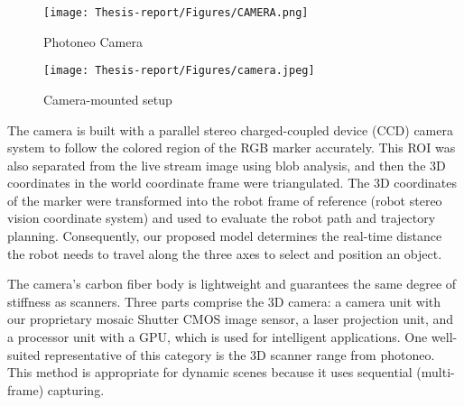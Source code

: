 \documentclass[12pt]{article}
\begin{document}
\begin{figure}[h]
    \centering
    \texttt{[image: Thesis-report/Figures/CAMERA.png]}
    \caption{Photoneo Camera \cite{ref2}} 
    \label{fig:Photoneo-camera}
\end{figure}

\begin{figure}[h]
    \centering
    \texttt{[image: Thesis-report/Figures/camera.jpeg]}
    \caption{Camera-mounted setup}
    \label{fig:camera-setup}
\end{figure}

The camera is built with a parallel stereo charged-coupled device (CCD) camera system to follow the colored region of the RGB marker accurately. This ROI was also separated from the live stream image using blob analysis, and then the 3D coordinates in the world coordinate frame were triangulated.   The 3D coordinates of the marker were transformed into the robot frame of reference (robot stereo vision coordinate system) and used to evaluate the robot path and trajectory planning.   Consequently, our proposed model determines the real-time distance the robot needs to travel along the three axes to select and position an object\cite{ref15}.

The camera's carbon fiber body is lightweight and guarantees the same degree of stiffness as scanners. Three parts comprise the 3D camera: a camera unit with our proprietary mosaic Shutter CMOS image sensor, a laser projection unit, and a processor unit with a GPU, which is used for intelligent applications.  One well-suited representative of this category is the 3D scanner range from photoneo. This method is appropriate for dynamic scenes because it uses sequential (multi-frame) capturing\cite{ref15}.
\end{document}
